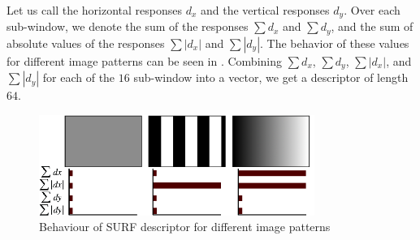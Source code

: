 Let us call the horizontal responses $d_x$ and the vertical responses $d_y$. Over each sub-window, we denote the sum of the responses $\sum d_x$ and $\sum d_y$, and the sum of absolute values of the responses $\sum |d_x|$ and $\sum |d_y|$. The behavior of these values for different image patterns can be seen in . Combining $\sum d_x$, $\sum d_y$, $\sum |d_x|$, and $\sum |d_y|$ for each of the $16$ sub-window into a vector, we get a descriptor of length $64$.

\begin{figure}
    \centering
    \includegraphics[width=0.8\textwidth]{Figures/surf/surf_descriptor.png}
    \caption[Behaviour of SURF descriptor for different image patterns]{Behaviour of SURF descriptor for different image patterns\cite{Bay2006}}
    \label{fig:surf_descriptor}
\end{figure}
